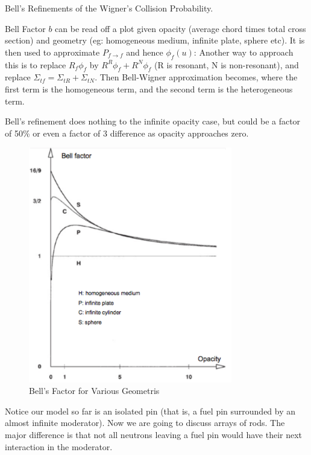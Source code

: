 \documentclass{school-22.211-notes}
\begin{document}
\clearpage
{}
Bell's Refinements of the Wigner's Collision Probability.

Bell Factor $b$ can be read off a plot given opacity (average chord times total cross section) and geometry (eg: homogeneous medium, infinite plate, sphere etc). It is then used to approximate $P_{f\to f}$ and hence $\phi_f(u)$:
Another way to approach this is to replace $R_f \phi_f$ by $R^R \phi_f + R^N \phi_f$ (R is resonant, N is non-resonant), and replace $\Sigma_{tf} = \Sigma_{tR} + \Sigma_{tN}$. Then 
Bell-Wigner approximation becomes, where the first term is the homogeneous term, and the second term is the heterogeneous term. 

Bell's refinement does nothing to the infinite opacity case, but could be a factor of 50\% or even a factor of 3 difference as opacity approaches zero. 
\begin{figure}[ht]
  \centering
  \includegraphics[width=3.5in]{images/r-m/bell.png}
  \caption{Bell's Factor for Various Geometris} \label{bell}
\end{figure}

\clearpage
{}
Notice our model so far is an isolated pin (that is, a fuel pin surrounded by an almost infinite moderator). Now we are going to discuss arrays of rods. The major difference is that not all neutrons leaving a fuel pin would have their next interaction in the moderator. 
\end{document}

